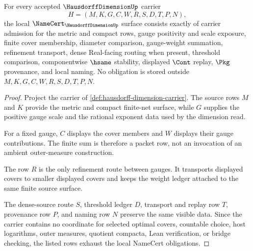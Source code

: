 \begin{theorem}
\label{thm:hausdorff-dimension-namecert-obligations}
For every accepted $\HausdorffDimensionUp$ carrier
$$
H=(M,K,G,C,W,R,S,D,T,P,N),
$$
the local $\NameCert_{\HausdorffDimensionUp}$ surface consists exactly of carrier admission for the metric and compact rows, gauge positivity and scale exposure, finite cover membership, diameter comparison, gauge-weight summation, refinement transport, dense Real-facing routing when present, threshold comparison, componentwise $\hsame$ stability, displayed $\Cont$ replay, $\Pkg$ provenance, and local naming. No obligation is stored outside $M,K,G,C,W,R,S,D,T,P,N$.
\end{theorem}
\begin{proof}
Project the carrier of \autoref{def:hausdorff-dimension-carrier}. The source rows $M$ and $K$ provide the metric and compact finite-net surface, while $G$ supplies the positive gauge scale and the rational exponent data used by the dimension read.

For a fixed gauge, $C$ displays the cover members and $W$ displays their gauge contributions. The finite sum is therefore a packet row, not an invocation of an ambient outer-measure construction.

The row $R$ is the only refinement route between gauges. It transports displayed covers to smaller displayed covers and keeps the weight ledger attached to the same finite source surface.

The dense-source route $S$, threshold ledger $D$, transport and replay row $T$, provenance row $P$, and naming row $N$ preserve the same visible data. Since the carrier contains no coordinate for selected optimal covers, countable choice, host logarithms, outer measures, quotient compacta, Lean verification, or bridge checking, the listed rows exhaust the local NameCert obligations.
\end{proof}

